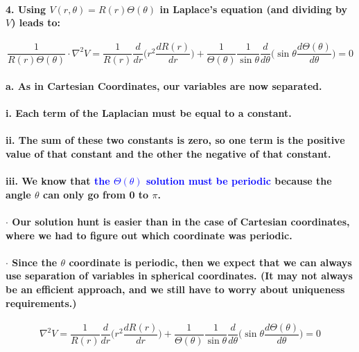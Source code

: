 \documentclass{article}
\begin{document}
\paragraph{4. Using $V(r,\theta)=R(r)\Theta(\theta)$ in Laplace's equation (and dividing by $V$) leads to:}
\begin{equation*}
    \frac{1}{R(r)\Theta(\theta)}\cdot\nabla^2V=\frac{1}{R(r)}\frac{d}{dr}\bigg(r^2\frac{dR(r)}{dr}\bigg)+\frac{1}{\Theta(\theta)}\frac{1}{\sin\theta}\frac{d}{d\theta}\bigg(\sin \theta \frac{d\Theta(\theta)}{d\theta}\bigg)=0
\end{equation*}
\paragraph{\indent a. As in Cartesian Coordinates, our variables are now separated.}
\paragraph{\indent\indent i. Each term of the Laplacian must be equal to a constant.}
\paragraph{\indent\indent ii. The sum of these two constants is zero, so one term is the positive value of that constant and the other the negative of that constant.}
\paragraph{\indent\indent iii. We know that \textcolor{blue}{the $\Theta(\theta)$ solution must be periodic} because the angle $\theta$ can only go from 0 to $\pi$.}
\paragraph{\indent \indent $\cdot$ Our solution hunt is easier than in the case of Cartesian coordinates, where we had to figure out which coordinate was periodic.}
\paragraph{\indent \indent $\cdot$ Since the $\theta$ coordinate is periodic, then we expect that we can always use separation of variables in spherical coordinates. (It may not always be an efficient approach, and we still have to worry about uniqueness requirements.)}
\begin{equation*}
    \nabla^2V=\frac{1}{R(r)}\frac{d}{dr}\bigg(r^2\frac{dR(r)}{dr}\bigg)+ \frac{1}{\Theta(\theta)}\frac{1}{\sin\theta}\frac{d}{d\theta}\bigg(\sin\theta\frac{d\Theta(\theta)}{d\theta}\bigg)=0
\end{equation*}
\end{document}
